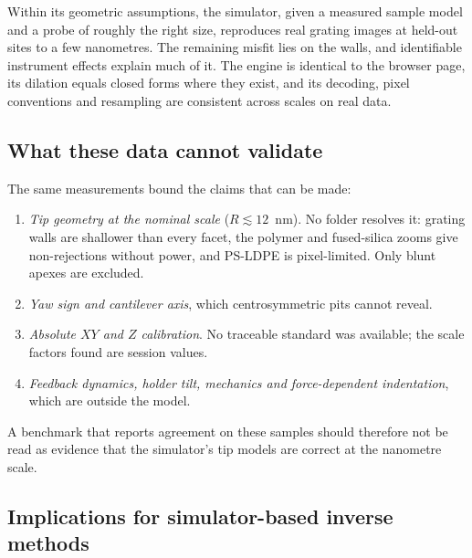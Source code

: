 \documentclass[preprint,12pt]{elsarticle}
\begin{document}
Within its geometric assumptions, the simulator, given a measured sample model and a probe of
roughly the right size, reproduces real grating images at held-out sites to a few nanometres. The
remaining misfit lies on the walls, and identifiable instrument effects explain much of it. The
engine is identical to the browser page, its dilation equals closed forms where they exist, and
its decoding, pixel conventions and resampling are consistent across scales on real data.

\subsection{What these data cannot validate}

The same measurements bound the claims that can be made:
\begin{enumerate}
  \item \emph{Tip geometry at the nominal scale} ($R\lesssim12$~nm). No folder resolves it: grating
        walls are shallower than every facet, the polymer and fused-silica zooms give
        non-rejections without power, and PS-LDPE is pixel-limited. Only blunt apexes are excluded.
  \item \emph{Yaw sign and cantilever axis}, which centrosymmetric pits cannot reveal.
  \item \emph{Absolute $XY$ and $Z$ calibration}. No traceable standard was available; the
        scale factors found are session values.
  \item \emph{Feedback dynamics, holder tilt, mechanics and force-dependent indentation}, which
        are outside the model.
\end{enumerate}
A benchmark that reports agreement on these samples should therefore not be read as evidence
that the simulator's tip models are correct at the nanometre scale.

\subsection{Implications for simulator-based inverse methods}
\end{document}
